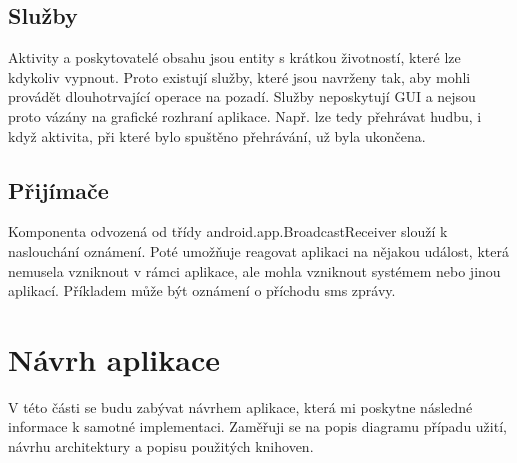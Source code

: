 \documentclass[12pt]{article}
\begin{document}
\subsection{Služby}
Aktivity a poskytovatelé obsahu jsou entity s krátkou životností, které lze kdykoliv vypnout. Proto existují služby, které jsou navrženy tak, aby mohli provádět dlouhotrvající operace na pozadí. Služby neposkytují GUI a nejsou proto vázány na grafické rozhraní aplikace. Např. lze tedy přehrávat hudbu, i když aktivita, při které bylo spuštěno přehrávání, už byla ukončena.
\subsection{Přijímače}
Komponenta odvozená od třídy android.app.BroadcastReceiver slouží k naslouchání oznámení. Poté umožňuje reagovat aplikaci na nějakou událost, která nemusela vzniknout v rámci aplikace, ale mohla vzniknout systémem nebo jinou aplikací. Příkladem může být oznámení o příchodu sms zprávy.
\newpage
\section{Návrh aplikace}
V této části se budu zabývat návrhem aplikace, která mi poskytne následné informace k samotné implementaci. Zaměřuji se na popis diagramu případu užití, návrhu architektury a popisu použitých knihoven.
\end{document}
